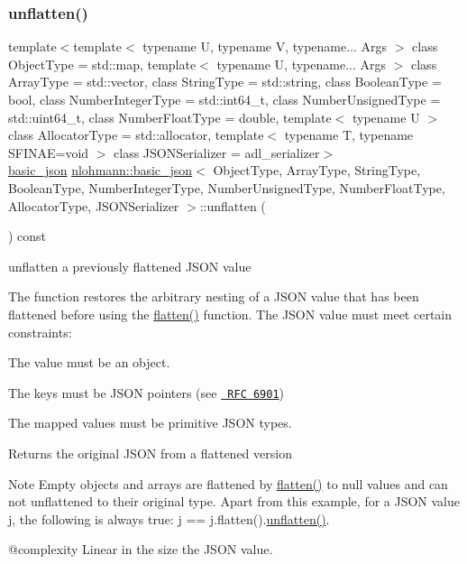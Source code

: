 \subsubsection{\texorpdfstring{unflatten()}{unflatten()}}
{\footnotesize\ttfamily template$<$template$<$ typename U, typename V, typename... Args $>$ class Object\+Type = std\+::map, template$<$ typename U, typename... Args $>$ class Array\+Type = std\+::vector, class String\+Type  = std\+::string, class Boolean\+Type  = bool, class Number\+Integer\+Type  = std\+::int64\+\_\+t, class Number\+Unsigned\+Type  = std\+::uint64\+\_\+t, class Number\+Float\+Type  = double, template$<$ typename U $>$ class Allocator\+Type = std\+::allocator, template$<$ typename T, typename S\+F\+I\+N\+A\+E=void $>$ class J\+S\+O\+N\+Serializer = adl\+\_\+serializer$>$ \\
\mbox{\hyperlink{classnlohmann_1_1basic__json}{basic\+\_\+json}} \mbox{\hyperlink{classnlohmann_1_1basic__json}{nlohmann\+::basic\+\_\+json}}$<$ Object\+Type, Array\+Type, String\+Type, Boolean\+Type, Number\+Integer\+Type, Number\+Unsigned\+Type, Number\+Float\+Type, Allocator\+Type, J\+S\+O\+N\+Serializer $>$\+::unflatten (\begin{DoxyParamCaption}{ }\end{DoxyParamCaption}) const\hspace{0.3cm}{\ttfamily [inline]}}



unflatten a previously flattened J\+S\+ON value 

The function restores the arbitrary nesting of a J\+S\+ON value that has been flattened before using the \mbox{\hyperlink{classnlohmann_1_1basic__json_ab838f000d76662917ffd6ec529569e03}{flatten()}} function. The J\+S\+ON value must meet certain constraints\+:
\begin{DoxyEnumerate}
\item The value must be an object.
\item The keys must be J\+S\+ON pointers (see \href{https://tools.ietf.org/html/rfc6901}{\texttt{ R\+FC 6901}})
\item The mapped values must be primitive J\+S\+ON types.
\end{DoxyEnumerate}

\begin{DoxyReturn}{Returns}
the original J\+S\+ON from a flattened version
\end{DoxyReturn}
\begin{DoxyNote}{Note}
Empty objects and arrays are flattened by \mbox{\hyperlink{classnlohmann_1_1basic__json_ab838f000d76662917ffd6ec529569e03}{flatten()}} to {\ttfamily null} values and can not unflattened to their original type. Apart from this example, for a J\+S\+ON value {\ttfamily j}, the following is always true\+: {\ttfamily j == j.\+flatten().\mbox{\hyperlink{classnlohmann_1_1basic__json_a74fa3ab2003f2f6f2b69deaafed9126d}{unflatten()}}}.
\end{DoxyNote}
@complexity Linear in the size the J\+S\+ON value.

